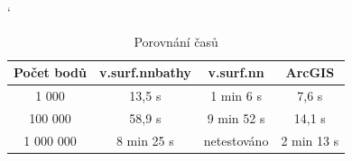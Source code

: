 \documentclass[12pt,a4paper]{article}
\begin{document}
\bigskip
\begin{table}[h]
\catcode`
\begin{tabular}{|c|c|c|c|}
\hline
Počet bodů & v.surf.nnbathy & v.surf.nn   & ArcGIS     \\ \hline
1 000      & 13,5 s         & 1 min 6 s   & 7,6 s      \\ \hline
100 000    & 58,9 s         & 9 min 52 s  & 14,1 s     \\ \hline
1 000 000  & 8 min 25 s     & netestováno & 2 min 13 s \\ \hline
\end{tabular}
\caption{Porovnání časů}
\label{tab:GRASSxArc}
\end{table}

\newpage
\begin{figure}[h!]
\centering
\begin{floatrow}
\end{floatrow}
\end{figure}
\end{document}
